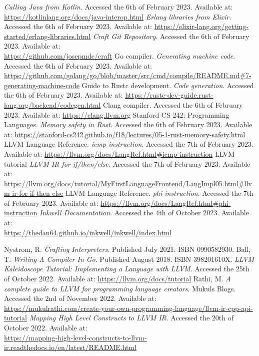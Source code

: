 ﻿\documentclass[10pt,a4paper,twocolumn,twoside]{article}
\begin{document}
\renewcommand\refname{References}
\begin{thebibliography}{11}
 \textit{Calling Java from Kotlin}. Accessed the 6th of February 2023. Available at: \url{https://kotlinlang.org/docs/java-interop.html}
 \textit{Erlang libraries from Elixir}. Accessed the 6th of February 2023. Available at: \url{https://elixir-lang.org/getting-started/erlang-libraries.html}
 \textit{Craft Git Repository}. Accessed the 6th of February 2023. Available at: \\\url{https://github.com/josepmdc/craft}
Go compiler. \textit{Generating machine code}. Accessed the 6th of February 2023. Available at: \url{https://github.com/golang/go/blob/master/src/cmd/compile/README.md#7-generating-machine-code}
 Guide to Rustc development. \textit{Code generation}. Accessed the 6th of February 2023. Available at: \url{https://rustc-dev-guide.rust-lang.org/backend/codegen.html}
 Clang compiler. Accessed the 6th of February 2023. Available at: \url{https://clang.llvm.org}
 Stanford CS 242: Programming Languages. \textit{Memory safety in Rust}. Accessed the 6th of February 2023. Available at: \url{https://stanford-cs242.github.io/f18/lectures/05-1-rust-memory-safety.html}
 LLVM Language Reference. \textit{icmp instruction}. Accessed the 7th of February 2023. Available at: \url{https://llvm.org/docs/LangRef.html#icmp-instruction}
 LLVM tutorial \textit{LLVM IR for if/then/else}. Accessed the 7th of February 2023. Available at: \url{https://llvm.org/docs/tutorial/MyFirstLanguageFrontend/LangImpl05.html#llvm-ir-for-if-then-else}
 LLVM Language Reference. \textit{phi instruction}. Accessed the 7th of February 2023. Available at: \url{https://llvm.org/docs/LangRef.html#phi-instruction}
 \textit{Inkwell Documentation}. Accessed the 4th of October 2023. Available at: \\\url{https://thedan64.github.io/inkwell/inkwell/index.html}
\end{thebibliography}

\renewcommand\refname{Bibliography}
\begin{thebibliography}{11}
 Nystrom, R. \textit{Crafting Interpreters}. Published July 2021. ISBN 0990582930.
 Ball, T. \textit{Writing A Compiler In Go}. Published August 2018. ISBN 398201610X.
 \textit{LLVM Kaleidoscope Tutorial: Implementing a Language with LLVM}. Accessed the 25th of October 2022. Available at: \url{https://llvm.org/docs/tutorial}
 Rathi, M. \textit{A complete guide to LLVM for programming language creators}. Mukuls Blogs. Accessed the 2nd of November 2022. Available at: \\\url{https://mukulrathi.com/create-your-own-programming-language/llvm-ir-cpp-api-tutorial}
 \textit{Mapping High Level Constructs to LLVM IR}. Accessed the 20th of October 2022. Available at: \\\url{https://mapping-high-level-constructs-to-llvm-ir.readthedocs.io/en/latest/README.html}
\end{thebibliography}
\end{document}
